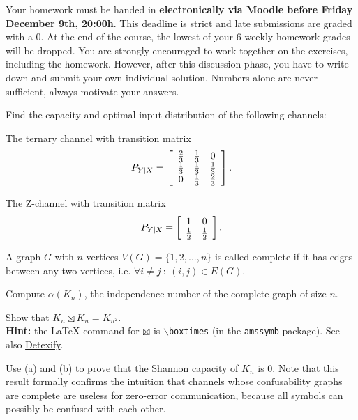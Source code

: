\documentclass[a4paper,10pt,landscape,twocolumn]{scrartcl}
\newcommand\deadline{Friday December 9th, 20:00h}
\begin{document}
\homeworkproblems

{\sffamily\noindent
Your homework must be handed in \textbf{electronically via Moodle before \deadline}. This deadline is strict and late submissions are graded with a 0. At the end of the course, the lowest of your 6 weekly homework grades will be dropped. You are strongly encouraged to work together on the exercises, including the homework. However, after this discussion phase, you have to write down and submit your own individual solution. Numbers alone are never sufficient, always motivate your answers.
}

\begin{exercise}
Find the capacity and optimal input distribution of the following channels:
	\begin{subex}[(2pt)]
	The ternary channel with transition matrix
	\[
	P_{Y|X} = \left[
	\begin{array}{c c c}
	\frac{2}{3}&\frac{1}{3}& 0\\
	\frac{1}{3}&\frac{1}{3}&\frac{1}{3}\\
	0&\frac{1}{3}&\frac{2}{3}
	\end{array}
	\right].
	\]
	\end{subex}
	\begin{subex}[(4pt)]
	The Z-channel with transition matrix
	\[
	P_{Y|X} = \left[
	\begin{array}{c c}
	1&0\\
	\frac{1}{2}&\frac{1}{2}
	\end{array}
	\right].
	\]
	\end{subex} 

\end{exercise}


\begin{exercise}
A graph $G$ with $n$ vertices $V(G) = \{1,2,...,n\}$ is called complete if it has edges between any two vertices, i.e. $\forall i \neq j \ : \ (i,j) \in E(G)$.
	\begin{subex}[(2pt)]
	Compute $\alpha(K_n)$, the independence number of the complete graph of size $n$.
	\end{subex}
	\begin{subex}[(2pt)]
	Show that $K_n \boxtimes K_n = K_{n^2}$.
	\\\textbf{Hint:} the \LaTeX{} command for $\boxtimes$ is \texttt{$\backslash$boxtimes} (in the \texttt{amssymb} package). See also \href{http://detexify.kirelabs.org/classify.html}{Detexify}.
	\end{subex}
	\begin{subex}[(2pt)]
	Use (a) and (b) to prove that the Shannon capacity of $K_n$ is 0. Note that this result formally confirms the intuition that channels whose confusability graphs are complete are useless for zero-error communication, because all symbols can possibly be confused with each other.
	\end{subex}
\end{exercise}
\end{document}
